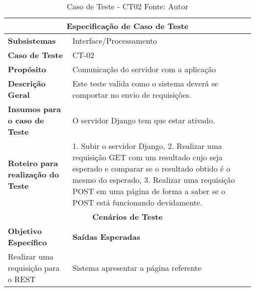 \begin{table}[H]
    \begin{center}
        \begin{tabular}{|p{5cm}|p{12cm}|}
            \hline
            \multicolumn{2}{|c|}{\textbf{Especificação de Caso de Teste}} \\ \hline
                \textbf{Subsistemas}                               & Interface/Processamento \\ \hline
                \textbf{Caso de Teste}                             & CT-02 \\ \hline
                \textbf{Propósito}                                     & Comunicação do servidor com a aplicação \\ \hline
                \textbf{Descrição Geral}                           & Este teste valida como o sistema deverá se comportar no envio de requisições. \\ \hline
                \textbf{Insumos para o caso de Teste}    & O servidor Django tem que estar ativado. \\ \hline
                \textbf{Roteiro para realização do Teste}&  1. Subir o servidor Django, 2. Realizar uma requisição GET com um resultado cujo seja esperado e comparar se o resultado obtido é o mesmo do esperado, 3. Realizar uma requisição POST em uma página de forma a saber se o POST está funcionando devidamente. \\ \hline
            \multicolumn{2}{|c|}{\textbf{Cenários de Teste}} \\ \hline
                \textbf{Objetivo Específico}                      & \textbf{Saídas Esperadas} \\ \hline
                Realizar uma requisição para o REST & Sistema apresentar a página referente \\ \hline
        \end{tabular}
    \end{center}
    \caption[Caso de Teste - CT02]{Caso de Teste - CT02
    \protect Fonte: Autor}
    \label{CT-02}
\end{table}

